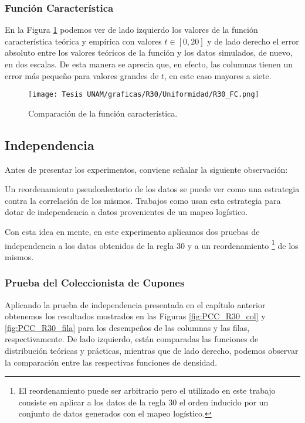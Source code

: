 \documentclass[../Main.tex]{subfiles}
\begin{document}
\subsubsection{Función Característica}
En la Figura \ref{fig:FC_R30} podemos ver de lado izquierdo los valores de la función característica teórica y empírica con valores $t \in [0,20] $ y de lado derecho el error absoluto entre los valores teóricos de la función y los datos simulados, de nuevo, en dos escalas. De esta manera se aprecia que, en efecto, las columnas tienen un error más pequeño para valores grandes de $t$, en este caso mayores a siete.

\begin{figure}[h!]
\hfill
\subfigure
{\texttt{[image: Tesis UNAM/graficas/R30/Uniformidad/R30\_FC.png]}}
\hfill
{}
\hfill
\caption{Comparación de la función característica.}
\label{fig:FC_R30}
\end{figure}

\subsection{Independencia}

Antes de presentar los experimentos, conviene señalar la siguiente observación:
 \begin{remark}
\label{obs:ord}
    Un reordenamiento pseudoaleatorio de los datos se puede ver como una estrategia contra la correlación de los mismos. Trabajos como \cite{Phatak1993} usan esta estrategia para dotar de independencia a datos provenientes de un mapeo logístico.
\end{remark}
Con esta idea en mente, en este experimento aplicamos dos pruebas de independencia a los datos obtenidos de la regla 30 y a un reordenamiento \footnote{El reordenamiento puede ser arbitrario pero el utilizado en este trabajo consiste en aplicar a los datos de la regla 30 el orden inducido por un conjunto de datos generados con el mapeo logístico.} de los mismos.

\subsubsection{Prueba del Coleccionista de Cupones}
Aplicando la prueba de independencia presentada en el capítulo anterior obtenemos los resultados mostrados en las Figuras \ref{fig:PCC_R30_col} y \ref{fig:PCC_R30_fila} para los desempeños de las columnas y las filas, respectivamente. De lado izquierdo, están comparadas las funciones de distribución teóricas y prácticas, mientras que de lado derecho, podemos observar la comparación entre las respectivas funciones de densidad.
\end{document}
